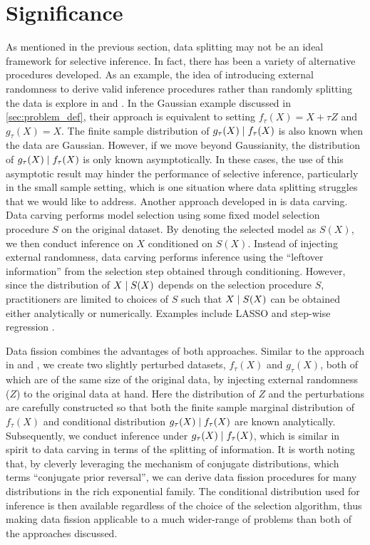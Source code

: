 \section{Significance}
As mentioned in the previous section, data splitting may not be an ideal framework for selective inference. In fact, there has been a variety of alternative procedures developed. As an example, the idea of introducing external randomness to derive valid inference procedures rather than randomly splitting the data is explore in \cite{tian2018selective} and \cite{rasines2021splitting}. In the Gaussian example discussed in \cref{sec:problem_def}, their approach is equivalent to setting $f_\tau(X) = X+\tau Z$ and $g_\tau(X) = X$. The finite sample distribution of $g_\tau(X) \mid f_\tau(X)$ is also known when the data are Gaussian. However, if we move beyond Gaussianity, the distribution of $g_\tau(X) \mid f_\tau(X)$ is only known asymptotically. In these cases, the use of this asymptotic result may hinder the performance of selective inference, particularly in the small sample setting, which is one situation where data splitting struggles that we would like to address. Another approach developed in \cite{fithian2014optimal} is data carving. Data carving performs model selection using some fixed model selection procedure $S$ on the original dataset. By denoting the selected model as $S(X)$, we then conduct inference on $X$ conditioned on $S(X)$. Instead of injecting external randomness, data carving performs inference using the ``leftover information'' from the selection step obtained through conditioning. However, since the distribution of $X\mid S(X)$ depends on the selection procedure $S$, practitioners are limited to choices of $S$ such that $X\mid S(X)$ can be obtained either analytically or numerically. Examples include LASSO \citep{lee2016exact} and step-wise regression \citep{tibshirani2016exact}.

Data fission combines the advantages of both approaches. Similar to the approach in \cite{tian2018selective} and \cite{rasines2021splitting}, we create two slightly perturbed datasets, $f_\tau(X)$ and $g_\tau(X)$, both of which are of the same size of the original data, by injecting external randomness ($Z$) to the original data at hand. Here the distribution of $Z$ and the perturbations are carefully constructed so that both the finite sample marginal distribution of $f_\tau(X)$ and conditional distribution $g_\tau(X)\mid f_\tau(X)$ are known analytically. Subsequently, we conduct inference under $g_\tau(X)\mid f_\tau(X)$, which is similar in spirit to data carving in terms of the splitting of information. It is worth noting that, by cleverly leveraging the mechanism of conjugate distributions, which \cite{leiner2022data} terms ``conjugate prior reversal'', we can derive data fission procedures for many distributions in the rich exponential family. The conditional distribution used for inference is then available regardless of the choice of the selection algorithm, thus making data fission applicable to a much wider-range of problems than both of the approaches discussed.

